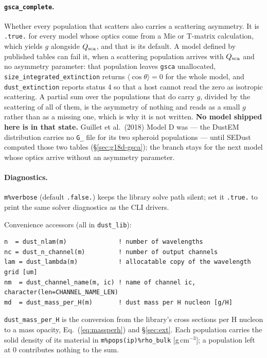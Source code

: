 \documentclass{my_memo}
\newcommand{\code}[1]{\texttt{#1}}
\begin{document}
\paragraph{\code{gsca\_complete}.} Whether every population that scatters also
carries a scattering asymmetry. It is \code{.true.} for every model whose
optics come from a Mie or T-matrix calculation, which yields $g$ alongside
$Q_{\rm sca}$, and that is its default. A model defined by published tables can
fail it, when a scattering population arrives with $Q_{\rm sca}$ and no
asymmetry parameter: that population leaves \code{gsca} unallocated,
\code{size\_integrated\_extinction} returns $\langle\cos\theta\rangle = 0$ for
the whole model, and \code{dust\_extinction} reports status 4 so that a host
cannot read the zero as isotropic scattering. A partial sum over the
populations that do carry $g$, divided by the scattering of all of them, is the
asymmetry of nothing and reads as a small $g$ rather than as a missing one,
which is why it is not written. \textbf{No model shipped here is in that
state.} Guillet et al.\ (2018) Model D was --- the DustEM distribution carries
no \code{G\_} file for its two spheroid populations --- until SEDust computed
those two tables (\S\ref{sec:g18d-gsca}); the branch stays for the next model
whose optics arrive without an asymmetry parameter.

\paragraph{Diagnostics.} \code{m\%verbose} (default \code{.false.}) keeps the
library solve path silent; set it \code{.true.} to print the same solver
diagnostics as the CLI drivers.

Convenience accessors (all in \code{dust\_lib}):
\begin{lstlisting}
n  = dust_nlam(m)              ! number of wavelengths
nc = dust_n_channel(m)         ! number of output channels
lam = dust_lambda(m)           ! allocatable copy of the wavelength grid [um]
nm  = dust_channel_name(m, ic) ! name of channel ic, character(len=CHANNEL_NAME_LEN)
md  = dust_mass_per_H(m)       ! dust mass per H nucleon [g/H]
\end{lstlisting}

\noindent \code{dust\_mass\_per\_H} is the conversion from the library's cross
sections per H nucleon to a mass opacity, Eq.~(\ref{eq:massperh}) and
\S\ref{sec:ext}. Each population carries the solid density of its material
in \code{m\%pops(ip)\%rho\_bulk} [g\,cm$^{-3}$]; a population left at $0$
contributes nothing to the sum.
\end{document}
